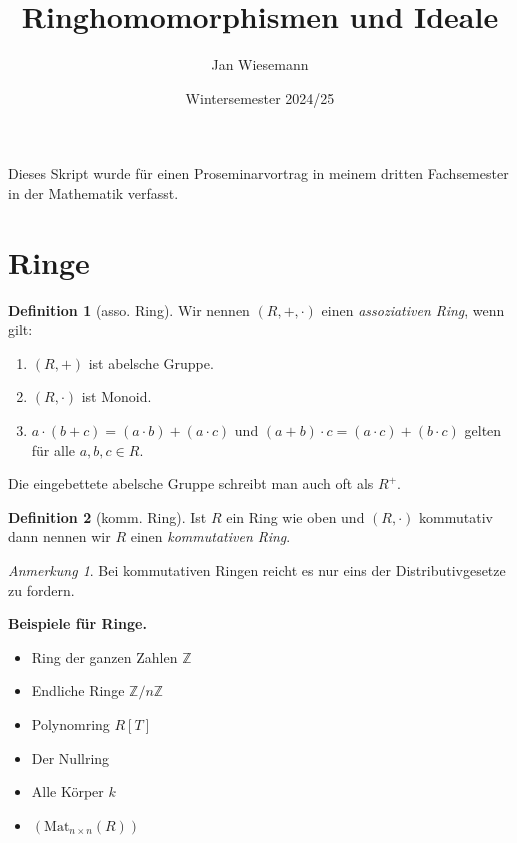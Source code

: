 \documentclass{article}
\theoremstyle{definition}
\newtheorem*{definition}{Definition}
\theoremstyle{remark}
\newtheorem*{anm}{Anmerkung}
\begin{document}
\title{\bf{Ringhomomorphismen und Ideale}}
\author{Jan Wiesemann}
\date{Wintersemester 2024/25}
\maketitle

Dieses Skript wurde für einen Proseminarvortrag in meinem dritten Fachsemester in der Mathematik verfasst.

\section{Ringe}

\begin{definition}[asso. Ring] Wir nennen $(R,+,\cdot)$ einen \emph{assoziativen Ring}, wenn gilt:
\begin{enumerate}[label=(\roman*)]
    \item $(R,+)$ ist abelsche Gruppe.
    \item $(R,\cdot)$ ist Monoid.
    \item $a\cdot(b+c)=(a\cdot b)+(a\cdot c)$ und $(a+b)\cdot c=(a\cdot c)+(b\cdot c)$ gelten für alle
        $a,b,c\in R$.
\end{enumerate}
\end{definition}

Die eingebettete abelsche Gruppe schreibt man auch oft als $R^+$.

\begin{definition}[komm. Ring] Ist $R$ ein Ring wie oben und $(R,\cdot)$ kommutativ dann nennen wir $R$
    einen \emph{kommutativen Ring}.
\end{definition}

\begin{anm} Bei kommutativen Ringen reicht es nur eins der Distributivgesetze zu fordern.
\end{anm}

\textbf{Beispiele für Ringe.} \begin{itemize}
    \item Ring der ganzen Zahlen $\mathbb{Z}$
    \item Endliche Ringe $\mathbb{Z}\slash n\mathbb{Z}$
    \item Polynomring $R[T]$
    \item Der Nullring
    \item Alle Körper $k$
    \item $(\mathrm{Mat}_{n\times n}(R))$
\end{itemize}
\end{document}
